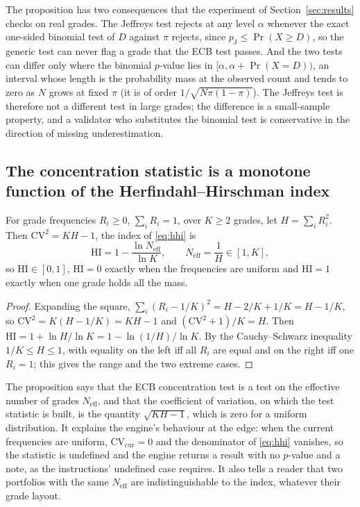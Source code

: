 The proposition has two consequences that the experiment of Section~\ref{sec:results} checks on real grades. The Jeffreys test rejects at any level $\alpha$ whenever the exact one-sided binomial test of $D$ against $\pi$ rejects, since $p_{\mathrm{J}}\le\Pr(X\ge D)$, so the generic test can never flag a grade that the ECB test passes. And the two tests can differ only where the binomial $p$-value lies in $[\alpha,\alpha+\Pr(X=D))$, an interval whose length is the probability mass at the observed count and tends to zero as $N$ grows at fixed $\pi$ (it is of order $1/\sqrt{N\pi(1-\pi)}$). The Jeffreys test is therefore not a different test in large grades; the difference is a small-sample property, and a validator who substitutes the binomial test is conservative in the direction of missing underestimation.

\subsection{The concentration statistic is a monotone function of the Herfindahl--Hirschman index}

\begin{proposition}\label{prop:hhi}
For grade frequencies $R_i\ge0$, $\sum_iR_i=1$, over $K\ge2$ grades, let $H=\sum_iR_i^2$. Then $\mathrm{CV}^2=KH-1$, the index of \eqref{eq:hhi} is
\begin{equation}
  \mathrm{HI}=1-\frac{\ln N_{\mathrm{eff}}}{\ln K},\qquad N_{\mathrm{eff}}=\frac1H\in[1,K],
  \label{eq:neff}
\end{equation}
so $\mathrm{HI}\in[0,1]$, $\mathrm{HI}=0$ exactly when the frequencies are uniform and $\mathrm{HI}=1$ exactly when one grade holds all the mass.
\end{proposition}

\begin{proof}
Expanding the square, $\sum_i(R_i-1/K)^2=H-2/K+1/K=H-1/K$, so $\mathrm{CV}^2=K(H-1/K)=KH-1$ and $(\mathrm{CV}^2+1)/K=H$. Then $\mathrm{HI}=1+\ln H/\ln K=1-\ln(1/H)/\ln K$. By the Cauchy--Schwarz inequality $1/K\le H\le1$, with equality on the left iff all $R_i$ are equal and on the right iff one $R_i=1$; this gives the range and the two extreme cases.
\end{proof}

The proposition says that the ECB concentration test is a test on the effective number of grades $N_{\mathrm{eff}}$, and that the coefficient of variation, on which the test statistic is built, is the quantity $\sqrt{KH-1}$, which is zero for a uniform distribution. It explains the engine's behaviour at the edge: when the current frequencies are uniform, $\mathrm{CV}_{\mathrm{cur}}=0$ and the denominator of \eqref{eq:hhi} vanishes, so the statistic is undefined and the engine returns a result with no $p$-value and a note, as the instructions' undefined case requires. It also tells a reader that two portfolios with the same $N_{\mathrm{eff}}$ are indistinguishable to the index, whatever their grade layout.


